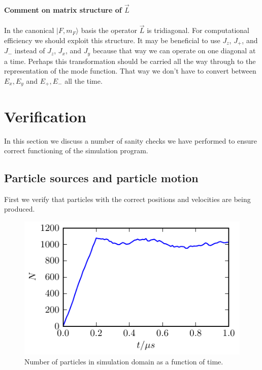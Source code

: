 \documentclass[aps, superscriptaddress, groupedaddress, preprint]{revtex4}
\begin{document}
\paragraph{Comment on matrix structure of $\vec{L}$} In the
canonical $|F,m_F\rangle$ basis the operator $\vec{L}$ is
tridiagonal.  For computational efficiency we should exploit this
structure.  It may be beneficial to use $J_z$, $J_+$, and $J_-$
instead of $J_z$, $J_x$, and $J_y$ because that way we can
operate on one diagonal at a time.  Perhaps this transformation
should be carried all the way through to the representation of
the mode function.  That way we don't have to convert between
$E_x,E_y$ and $E_+, E_-$ all the time.


\section{Verification}

In this section we discuss a number of sanity checks we have
performed to ensure correct functioning of the simulation
program.


\subsection{Particle sources and particle motion}

First we verify that particles with the correct positions and
velocities are being produced.

\begin{figure}
\begin{center}
\includegraphics{ptcl_source/numPtclsVsT.pdf}
\end{center}
\caption{Number of particles in simulation domain as a function
of time.}
\end{figure}
\end{document}
